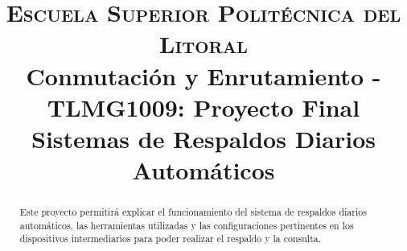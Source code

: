 \documentclass[conference]{IEEEtran}
\begin{document}
\title{
{\large \textsc{Escuela Superior Politécnica del Litoral}\\
Conmutación y Enrutamiento - TLMG1009: Proyecto Final
}\\
Sistemas de Respaldos Diarios Automáticos\\
}

\author{
\and
{}
\and
{}
\and
{}
\and
{}
}


\maketitle

\begin{abstract}
	Este proyecto permitirá explicar el funcionamiento del sistema de respaldos diarios automáticos, las herramientas utilizadas y las configuraciones pertinentes en los dispositivos intermediarios para poder realizar el respaldo y la consulta. 
\end{abstract}
\end{document}
